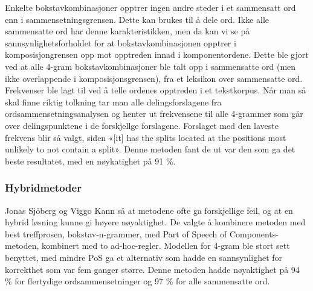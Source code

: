 Enkelte bokstavkombinasjoner opptrer ingen andre steder i et sammensatt ord enn i sammensetningsgrensen. Dette kan brukes til å dele ord. Ikke alle sammensatte ord har denne karakteristikken, men da kan vi se på sannsynlighetsforholdet for at bokstavkombinasjonen opptrer i komposisjongrensen opp mot opptreden innad i komponentordene. Dette ble gjort ved at alle 4-gram bokstavkombinasjoner ble talt opp i sammensatte ord (men ikke overlappende i komposisjonsgrensen), fra et leksikon over sammensatte ord. Frekvenser ble lagt til ved å telle ordenes opptreden i et tekstkorpus. Når man så skal finne riktig tolkning tar man alle delingsforslagene fra ordsammensetningsanalysen og henter ut frekvensene til alle 4-grammer som går over delingspunktene i de forskjellge forslagene. Forslaget med den laveste frekvens blir så valgt, siden «[it] has the splits located at the positions most unlikely to not contain a split»\cite{sjobergh2004finding}. Denne metoden fant de ut var den som ga det beste resultatet, med en nøykatighet på 91 \%. 

\subsubsection{Hybridmetoder}

Jonas Sjöberg og Viggo Kann så at metodene ofte ga forskjellige feil, og at en hybrid løsning kunne gi høyere nøyaktighet. De valgte å kombinere metoden med best treffprosen, bokstav-n-grammer, med Part of Speech of Components-metoden, kombinert med to ad-hoc-regler. Modellen for 4-gram ble stort sett benyttet, med mindre PoS ga et alternativ som hadde en sannsynlighet for korrekthet som var fem ganger større. Denne metoden hadde nøyaktighet på 94 \% for flertydige ordsammensetninger og 97 \% for alle sammensatte ord. 
